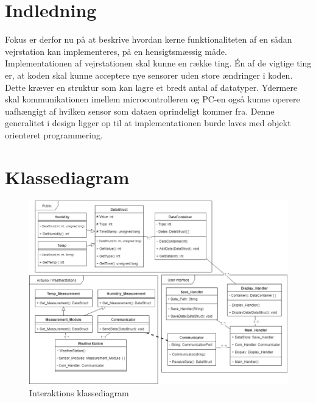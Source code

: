 
\section{Indledning}
Fokus er derfor nu på at beskrive hvordan kerne funktionaliteten af en sådan vejrstation kan implementeres, på en hensigtsmæssig måde.\\
Implementationen af vejrstationen skal kunne en række ting. Én af de vigtige ting er, at koden skal kunne acceptere nye sensorer uden store ændringer i koden. Dette kræver en struktur som kan lagre et bredt antal af datatyper. Ydermere skal kommunikationen imellem microcontrolleren og PC-en også kunne operere uafhængigt af hvilken sensor som dataen oprindeligt kommer fra. Denne generalitet i design ligger op til at implementationen burde laves med objekt orienteret programmering. 

\section{Klassediagram}
\begin{figure}[H]
    \centering
    \includegraphics[width=1\textwidth, angle =0]{Struktureret_System_Udvikling/Workshop_2/Assets/Workshop2_ClassDiagram.png}
    \caption{Interaktions klassediagram}
    \label{fig:classdiagram}
\end{figure}


